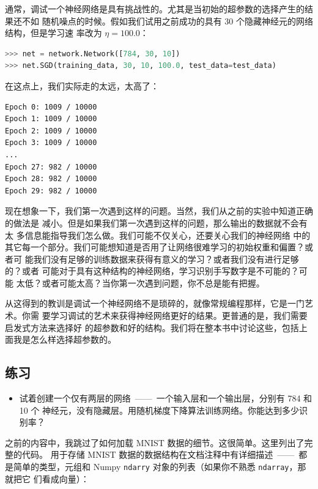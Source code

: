 通常，调试一个神经网络是具有挑战性的。尤其是当初始的超参数的选择产生的结果还不如
随机噪点的时候。假如我们试用之前成功的具有 30 个隐藏神经元的网络结构，但是学习速
率改为 $\eta = 100.0$：

\begin{lstlisting}[language=Python]
>>> net = network.Network([784, 30, 10])
>>> net.SGD(training_data, 30, 10, 100.0, test_data=test_data)
\end{lstlisting}

在这点上，我们实际走的太远，\learningrate{}太高了：

\begin{lstlisting}[language=sh]
Epoch 0: 1009 / 10000
Epoch 1: 1009 / 10000
Epoch 2: 1009 / 10000
Epoch 3: 1009 / 10000
...
Epoch 27: 982 / 10000
Epoch 28: 982 / 10000
Epoch 29: 982 / 10000
\end{lstlisting}

现在想象一下，我们第一次遇到这样的问题。当然，我们从之前的实验中知道正确的做法是
减小\learningrate{}。但是如果我们第一次遇到这样的问题，那么输出的数据就不会有太
多信息能指导我们怎么做。我们可能不仅关心\learningrate{}，还要关心我们的神经网络
中的其它每一个部分。我们可能想知道是否用了让网络很难学习的初始权重和偏置？或者可
能我们没有足够的训练数据来获得有意义的学习？或者我们没有进行足够的\epoch{}？或者
可能对于具有这种结构的神经网络，学习识别手写数字是不可能的？可能\learningrate{}
太低？或者可能\learningrate{}太高？当你第一次遇到问题，你不总是能有把握。

从这得到的教训是调试一个神经网络不是琐碎的，就像常规编程那样，它是一门艺术。你需
要学习调试的艺术来获得神经网络更好的结果。更普通的是，我们需要启发式方法来选择好
的超参数和好的结构。我们将在整本书中讨论这些，包括上面我是怎么样选择超参数的。

\subsection*{练习}

\begin{itemize}
\item 试着创建一个仅有两层的网络~——~一个输入层和一个输出层，分别有 784 和 10 个
  神经元，没有隐藏层。用随机梯度下降算法训练网络。你能达到多少识别率？
\end{itemize}

之前的内容中，我跳过了如何加载 MNIST 数据的细节。这很简单。这里列出了完整的代码。
用于存储 MNIST 数据的数据结构在文档注释中有详细描述~——~都是简单的类型，元组和
Numpy \lstinline!ndarry! 对象的列表（如果你不熟悉 \lstinline!ndarray!，那就把它
  们看成向量）：

